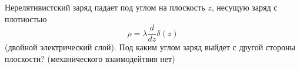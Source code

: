 \begin{tproblem}
  Нерелятивистский заряд падает под углом на плоскость $z$, несущую
  заряд с плотностью
  \begin{equation*}
    ρ=λ\frac{d}{dz}δ(z)
  \end{equation*}
  (двойной электрический слой). Под каким углом заряд выйдет с другой
  стороны плоскости? (механического взаимодейтвия нет)
\end{tproblem}
